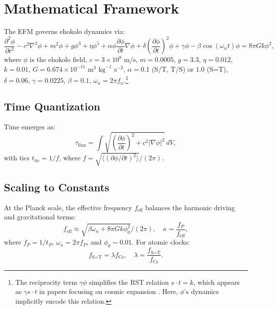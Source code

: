 \documentclass[11pt]{article}
\begin{document}
\section{Mathematical Framework}
The EFM governs ehokolo dynamics via:
\begin{equation}
\frac{\partial^2 \phi}{\partial t^2} - c^2 \nabla^2 \phi + m^2 \phi + g \phi^3 + \eta \phi^5 + \alpha \phi \frac{\partial \phi}{\partial t} \nabla \phi + \delta \left(\frac{\partial \phi}{\partial t}\right)^2 \phi + \gamma \phi - \beta \cos(\omega_n t) \phi = 8 \pi G k \phi^2,
\end{equation}
where \(\phi\) is the ehokolo field, \(c = 3 \times 10^8 \text{ m/s}\), \(m = 0.0005\), \(g = 3.3\), \(\eta = 0.012\), \(k = 0.01\), \(G = 6.674 \times 10^{-11} \text{ m}^3 \text{ kg}^{-1} \text{ s}^{-2}\), \(\alpha = 0.1\) (S/T, T/S) or \(1.0\) (S=T), \(\delta = 0.06\), \(\gamma = 0.0225\), \(\beta = 0.1\), \(\omega_n = 2 \pi f_n\).\footnote{The reciprocity term \(\gamma \phi\) simplifies the RST relation \( s \cdot t = k \), which appears as \(\gamma s \cdot t\) in papers focusing on cosmic expansion \citep{emvula2025grand}. Here, \(\phi\)’s dynamics implicitly encode this relation.}

\subsection{Time Quantization}
Time emerges as:
\begin{equation}
\tau_{\text{flux}} = \int \sqrt{\left(\frac{\partial \phi}{\partial t}\right)^2 + c^2 |\nabla \phi|^2} \, dV,
\end{equation}
with tics \( t_{\text{tic}} = 1/f \), where \( f = \sqrt{\langle (\partial \phi / \partial t)^2 \rangle} / (2 \pi) \).

\subsection{Scaling to Constants}
At the Planck scale, the effective frequency \( f_{\text{eff}} \) balances the harmonic driving and gravitational terms:
\begin{equation}
f_{\text{eff}} \approx \sqrt{\beta \omega_n + 8 \pi G k \phi_0^2} / (2 \pi), \quad \kappa = \frac{f_P}{f_{\text{eff}}},
\end{equation}
where \( f_P = 1 / t_P \), \(\omega_n = 2 \pi f_P\), and \(\phi_0 \sim 0.01\). For atomic clocks:
\begin{equation}
f_{\text{S=T}} = \lambda f_{\text{Cs}}, \quad \lambda = \frac{f_{\text{S=T}}}{f_{\text{Cs}}}.
\end{equation}
\end{document}
